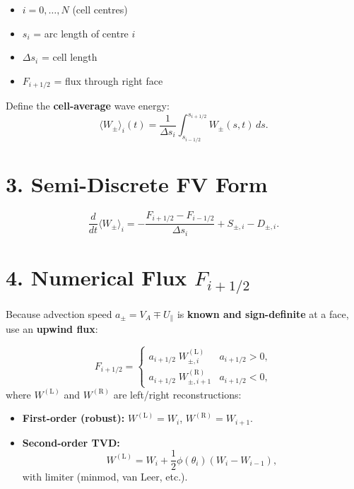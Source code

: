 \begin{itemize}
    \item $i = 0, \ldots, N$ (cell centres)
    \item $s_i$ = arc length of centre $i$
    \item $\Delta s_i$ = cell length
    \item $F_{i+1/2}$ = flux through right face
\end{itemize}

Define the \textbf{cell-average} wave energy:
\[
\langle W_\pm \rangle_i(t) = \frac{1}{\Delta s_i} \int_{s_{i-1/2}}^{s_{i+1/2}} W_\pm(s, t)\, ds.
\]

\hrulefill

\section*{3. Semi-Discrete FV Form}

\begin{equation}
\boxed{
\frac{d}{dt} \langle W_\pm \rangle_i
= -\frac{F_{i+1/2} - F_{i-1/2}}{\Delta s_i}
+ S_{\pm, i} - D_{\pm, i}.
}
\tag{2}
\end{equation}

\hrulefill

\section*{4. Numerical Flux $F_{i+1/2}$}

Because advection speed $a_\pm = V_A \mp U_\parallel$ is \textbf{known and sign-definite} at a face, use an \textbf{upwind flux}:

\begin{equation}
F_{i+1/2} =
\begin{cases}
a_{i+1/2}\; W_{\pm,i}^{(\text{L})} & a_{i+1/2} > 0, \\
a_{i+1/2}\; W_{\pm,i+1}^{(\text{R})} & a_{i+1/2} < 0,
\end{cases}
\tag{3}
\end{equation}
where $W^{(\text{L})}$ and $W^{(\text{R})}$ are left/right reconstructions:
\begin{itemize}
    \item \textbf{First-order (robust):} $W^{(\text{L})} = W_i$, $W^{(\text{R})} = W_{i+1}$.
    \item \textbf{Second-order TVD:}
    \[
    W^{(\text{L})} = W_i + \frac{1}{2} \phi(\theta_i)(W_i - W_{i-1}),
    \]
    with limiter (minmod, van Leer, etc.).
\end{itemize}

